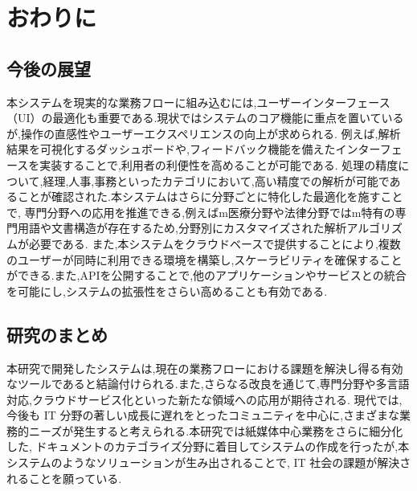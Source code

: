 \chapter{おわりに}
\label{ch:con}

\quad

\section{今後の展望}
\label{sec:con_future}

本システムを現実的な業務フローに組み込むには,ユーザーインターフェース（UI）の最適化も重要である.現状ではシステムのコア機能に重点を置いているが,操作の直感性やユーザーエクスペリエンスの向上が求められる.
例えば,解析結果を可視化するダッシュボードや,フィードバック機能を備えたインターフェースを実装することで,利用者の利便性を高めることが可能である.
処理の精度について,経理,人事,事務といったカテゴリにおいて,高い精度での解析が可能であることが確認された.本システムはさらに分野ごとに特化した最適化を施すことで,
専門分野への応用を推進できる,例えばm医療分野や法律分野ではm特有の専門用語や文書構造が存在するため,分野別にカスタマイズされた解析アルゴリズムが必要である.
また,本システムをクラウドベースで提供することにより,複数のユーザーが同時に利用できる環境を構築し,スケーラビリティを確保することができる.また,APIを公開することで,他のアプリケーションやサービスとの統合を可能にし,システムの拡張性をさらい高めることも有効である.

\section{研究のまとめ}
\label{sec:con_fin}

本研究で開発したシステムは,現在の業務フローにおける課題を解決し得る有効なツールであると結論付けられる.また,さらなる改良を通じて,専門分野や多言語対応,クラウドサービス化といった新たな領域への応用が期待される.
現代では,今後も IT 分野の著しい成長に遅れをとったコミュニティを中心に,さまざまな業務的ニーズが発生すると考えられる.本研究では紙媒体中心業務をさらに細分化した,
ドキュメントのカテゴライズ分野に着目してシステムの作成を行ったが,本システムのようなソリューションが生み出されることで, IT 社会の課題が解決されることを願っている.
